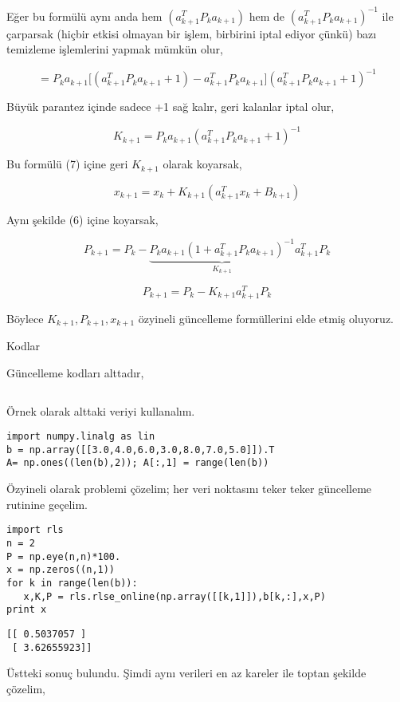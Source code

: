 \documentclass[12pt,fleqn]{article}\usepackage{../../common}
\begin{document}
Eğer bu formülü aynı anda hem $(a_{k+1}^TP_ka_{k+1})$ hem de $(a_{k+1}^TP_ka_{k+1})^{-1}$ 
ile çarparsak (hiçbir etkisi olmayan bir işlem, birbirini iptal ediyor
çünkü) bazı temizleme işlemlerini yapmak mümkün olur,

$$ 
= P_ka_{k+1} 
\big[ (a_{k+1}^T P_k a_{k+1} + 1) -  a_{k+1}^TP_ka_{k+1} \big] (a_{k+1}^T P_k a_{k+1} + 1)^{-1}
$$

Büyük parantez içinde sadece +1 sağ kalır, geri kalanlar iptal olur,

$$ 
K_{k+1} = P_ka_{k+1} (a_{k+1}^T P_k a_{k+1} + 1)^{-1}
$$

Bu formülü (7) içine geri $K_{k+1}$ olarak koyarsak, 

$$ x_{k+1} = x_k + K_{k+1}(a_{k+1}^Tx_k  + B_{k+1})  
$$

Aynı şekilde (6) içine koyarsak,

$$ 
P_{k+1} = P_k - 
\underbrace{P_k a_{k+1}(1 + a_{k+1}^T P_k a_{k+1})^{-1}}_{K_{k+1}}
a_{k+1}^TP_k 
$$

$$ 
P_{k+1} = P_k - K_{k+1}a_{k+1}^TP_k 
$$

Böylece $K_{k+1},P_{k+1},x_{k+1}$ özyineli güncelleme formüllerini elde
etmiş oluyoruz. 

Kodlar

Güncelleme kodları alttadır,

\inputminted[fontsize=\footnotesize]{python}{rls.py}

Örnek olarak alttaki veriyi kullanalım. 

\begin{verbatim}
import numpy.linalg as lin
b = np.array([[3.0,4.0,6.0,3.0,8.0,7.0,5.0]]).T
A= np.ones((len(b),2)); A[:,1] = range(len(b))
\end{verbatim}

Özyineli olarak problemi çözelim; her veri noktasını teker teker güncelleme 
rutinine geçelim. 

\begin{verbatim}
import rls
n = 2
P = np.eye(n,n)*100.
x = np.zeros((n,1))
for k in range(len(b)):
   x,K,P = rls.rlse_online(np.array([[k,1]]),b[k,:],x,P)
print x
\end{verbatim}

\begin{verbatim}
[[ 0.5037057 ]
 [ 3.62655923]]
\end{verbatim}

Üstteki sonuç bulundu. Şimdi aynı verileri en az kareler ile toptan şekilde
çözelim,
\end{document}
